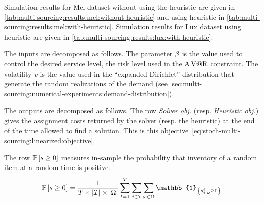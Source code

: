 

Simulation results for Mel dataset without using the heuristic are given in \cref{tab:multi-sourcing:results:mel:without-heuristic} and using heuristic in \cref{tab:multi-sourcing:results:mel:with-heuristic}.
Simulation results for Lux dataset using heuristic are given in \cref{tab:multi-sourcing:results:lux:with-heuristic}.


The inputs are decomposed as follows.
The parameter $\beta$ is the value used to control the desired service level, \ie the risk level used in the $\operatorname{A\operatorname{V@R}}$ constraint.
The volatility $v$ is the value used in the ``expanded Dirichlet'' distribution that generate the random realizations of the demand (see \cref{sec:multi-sourcing:numerical-experiments:demand-distribution}).


The outputs are decomposed as follows.
The row \emph{Solver obj.} (resp. \emph{Heuristic obj.}) gives the assignment costs returned by the solver (resp. the heuristic) at the end of the time allowed to find a solution.
This is this objective~\eqref{eq:stoch-multi-sourcing:linearized:objective}.


The row $\prob\sqbracket{s\ge0}$ measures in-sample the probability that inventory of a random item at a random time is positive.
\begin{equation}
  \prob\sqbracket{s\ge0}=\frac{1}{\horizon\times\card{\REF}\times\card{\scenarios}}\sum_{t=1}^{\horizon}\sum_{i\in\REF}\sum_{\omega\in\scenarios} \mathbb{1}_{\crbracket{\inventory_{t,\omega}^i\ge0}}
\end{equation}


